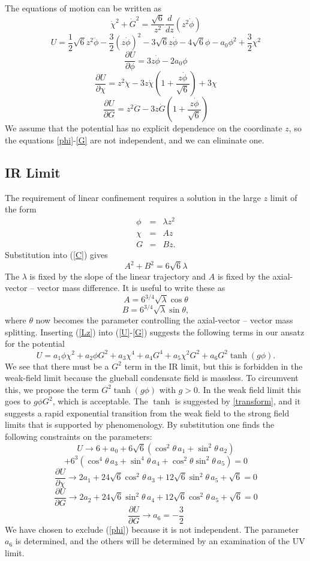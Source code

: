 \documentclass[aps,prd,12pt,nofootinbib]{revtex4}
\newcommand{\be}{\begin{equation}}
\newcommand{\ee}{\end{equation}}
\newcommand{\ba}{\begin{eqnarray}}
\newcommand{\ea}{\end{eqnarray}}
\newcommand{\bd}{\begin{displaymath}}
\newcommand{\ed}{\end{displaymath}}
\def\thalf{{\textstyle{\frac{1}{2}}}}
\def\tthalf{{\textstyle{\frac{3}{2}}}}
\def\Dz{\frac{d}{dz}}
\def\phidot{\dot{\phi}}
\def\phiddot{\ddot{\phi}}
\def\chidot{\dot{\chi}}
\def\chiddot{\ddot{\chi}}
\def\Gdot{\dot{G}}
\def\Gddot{\ddot{G}}
\def\rt6{\sqrt{6}}
\begin{document}
The equations of motion can be written as
\be
\chidot^2 + \Gdot^2 = \frac{\rt6}{z^2} \Dz(z^2\phidot)
\label{C}
\ee
\be
U=\thalf \rt6 z^2 \phiddot - \tthalf (z\phidot)^2 - 3 \rt6 z\phidot 
-4\sqrt{6}\phi - a_0\phi^2 +\tthalf\chi^2
\label{U}
\ee
\be
 \frac{\partial U}{\partial \phi}=3z\phidot - 2a_0\phi
\label{phi}
\ee
\be
 \frac{\partial U}{\partial \chi}
=z^2\chiddot -3z\chidot \left(1+\frac{z\phidot}{\rt6} \right) + 3\chi
\label{chi}
\ee
\be
 \frac{\partial U}{\partial G}=
z^2\Gddot -3z\Gdot \left(1+\frac{z\phidot}{\rt6} \right)
\label{G}
\ee
We assume that the potential has no explicit dependence on the coordinate $z$,  so the equations \ref{phi}-\ref{G} are not independent, and we can eliminate one. 

\subsection{IR Limit}

The requirement of linear confinement requires a solution in the large $z$ limit of the  form
\ba
\phi &=& \lambda z^2 \\
\chi &=& Az \\
G &=& B z.
\label{Lz}
\ea
Substitution into (\ref{C}) gives
\be
A^2 + B^2 = 6\rt6 \lambda
\label{Clarge}
\ee
The $\lambda$ is fixed by the slope of the linear trajectory and $A$ is fixed by the axial-vector -- vector mass difference.  
It is useful to write these as
\bd
A = 6^{3/4} \sqrt{\lambda} \cos\theta
\ed
\be
B = 6^{3/4} \sqrt{\lambda} \sin\theta,
\ee
where $\theta$ now becomes the parameter controlling the axial-vector -- vector mass splitting.
Inserting (\ref{Lz}) into (\ref{U}-\ref{G}) suggests the following terms in our ansatz for the potential
\be
U =  a_1 \phi \chi^2 + a_2 \phi G^2 + a_3 \chi^4 + a_4 G^4 + a_5 \chi^2 G^2 
+ a_6 G^2 \tanh(g\phi).
\ee
We see that there must be a $G^2$ term in the IR limit, but this is forbidden in the weak-field limit because the glueball condensate field is massless. 
To circumvent this, we propose the term $G^2 \tanh(g\phi)$ with $g>0$.  
In the weak field limit this goes to $g\phi G^2$, which is acceptable.  
The $\tanh$ is suggested by \ref{transform}, and it suggests a rapid exponential transition from the weak field to the strong field limits that is supported by phenomenology.
By substitution one finds the following constraints on the parameters:
\bd
U \rightarrow 6 + a_0 + 6\rt6 \left( \cos^2 \theta \, a_1 + \sin^2 \theta \, a_2 \right)
\ed
\be
+ 6^3 \left( \cos^4 \theta \, a_3 + \sin^4 \theta \, a_4 + \cos^2 \theta \sin^2 \theta \, a_5 \right) = 0
\ee
\be
\frac{\partial U}{\partial \chi} \rightarrow
2a_1 + 24\rt6 \cos^2\theta \, a_3 + 12\rt6 \sin^2\theta \, a_5 + \rt6 = 0
\ee
\be
\frac{\partial U}{\partial G} \rightarrow
2a_2 + 24\rt6 \sin^2\theta \, a_4 + 12\rt6 \cos^2\theta \, a_5 + \rt6 = 0
\ee
\be
\frac{\partial U}{\partial G} \rightarrow
a_6 = - \tthalf \label{LargeZ2}
\ee
We have chosen to exclude (\ref{phi}) because it is not independent. 
The parameter $a_6$ is determined, and the others will be determined by an examination of the UV limit.
\end{document}
